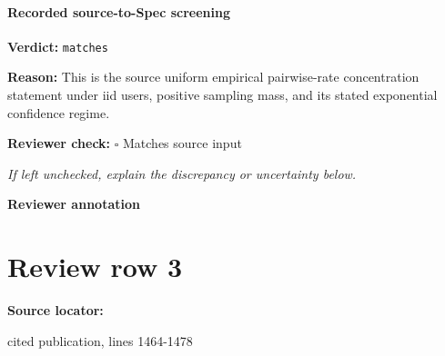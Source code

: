 \documentclass[10pt]{article}
\newcommand{\reviewerbox}{%
  \par\noindent\fbox{\parbox{0.96\linewidth}{\rule{0pt}{0.38in}}}\par
}
\newcommand{\reviewmatch}[1]{%
  \par\noindent\textbf{Reviewer check:} $\square$\; #1\par
  \noindent\emph{If left unchecked, explain the discrepancy or uncertainty below.}\par
}
\begin{document}
\paragraph{Recorded source-to-Spec screening}
\textbf{Verdict:} \texttt{matches}
\\
{\raggedright
\textbf{Reason:} This is the source uniform empirical pairwise-\allowbreak{}rate concentration statement under iid users, positive sampling mass, and its stated exponential confidence regime.\allowbreak{}
\par}
\reviewmatch{Matches source input}
\noindent\textbf{Reviewer annotation}\par
\reviewerbox
\clearpage
\hypertarget{source-claim-069675611a64cc9c}{}
\section*{Review row 3}
\textbf{Source locator:} {\footnotesize\raggedright cited publication, lines 1464-\allowbreak{}1478\par}
\end{document}
